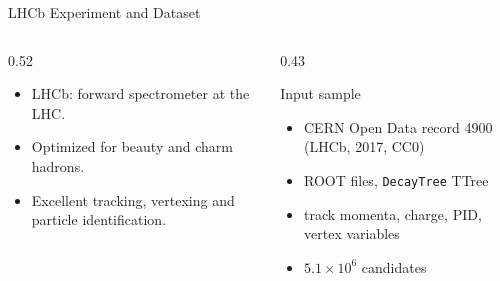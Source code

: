 \documentclass[aspectratio=169,10pt]{beamer}
\begin{document}
\begin{frame}{LHCb Experiment and Dataset}
  \begin{columns}[T,onlytextwidth]
    \begin{column}{0.52\textwidth}
      \begin{itemize}
        \item LHCb: forward spectrometer at the LHC.
        \item Optimized for beauty and charm hadrons.
        \item Excellent tracking, vertexing and particle identification.
      \end{itemize}
    \end{column}
    \begin{column}{0.43\textwidth}
      \begin{block}{Input sample}
        \begin{itemize}
          \item CERN Open Data record 4900 (LHCb, 2017, CC0)
          \item ROOT files, \texttt{DecayTree} TTree
          \item track momenta, charge, PID, vertex variables
          \item $5.1\times10^6$ candidates
        \end{itemize}
      \end{block}
    \end{column}
  \end{columns}
\end{frame}
\end{document}

